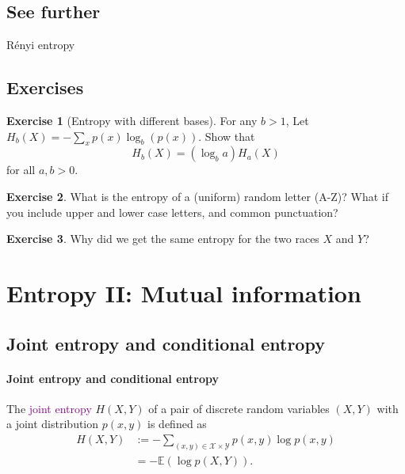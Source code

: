 \documentclass[a4paper, 11pt, openany]{book}
\numberwithin{equation}{section}
\theoremstyle{plain}
\theoremstyle{definition}
\newtheorem{exercise}   {Exercise}  [section]
\newcommand{\expectation}{\mathbb{E}}
\newcommand{\Define}[1]{\textcolor{purple}{#1}}
\newcommand{\alphabet}[1]{\mathcal{#1}}
\begin{document}
\subsection{See further}


R\'enyi entropy

\subsection{Exercises}




\begin{exercise}[Entropy with different bases]
For any $b>1$, Let $H_b(X) = - \sum_x p(x) \log_b(p(x))$. Show that
$$
	H_b(X) = (\log_b a) H_a(X)
$$
for all $a,b > 0$.
\end{exercise}

\begin{exercise}
What is the entropy of a (uniform) random letter (A-Z)? What if you include upper and lower case letters, and common punctuation?
\end{exercise}


\begin{exercise}
Why did we get the same entropy for the two races $X$ and $Y$?
\end{exercise}

















\section{Entropy II: Mutual information}
\label{sec:32}




\subsection{Joint entropy and conditional entropy}

\paragraph{Joint entropy and conditional entropy}


The \Define{joint entropy} $H(X,Y)$ of a pair of discrete random variables $(X,Y)$ with a joint distribution $p(x,y)$ is defined as
\begin{align*}
	H(X,Y) &:= - \sum_{(x,y) \in \alphabet{X} \times \alphabet{Y}} p(x,y) \log p(x,y)\\
	&= -\expectation \left( \log p(X,Y) \right).
\end{align*}
\end{document}
